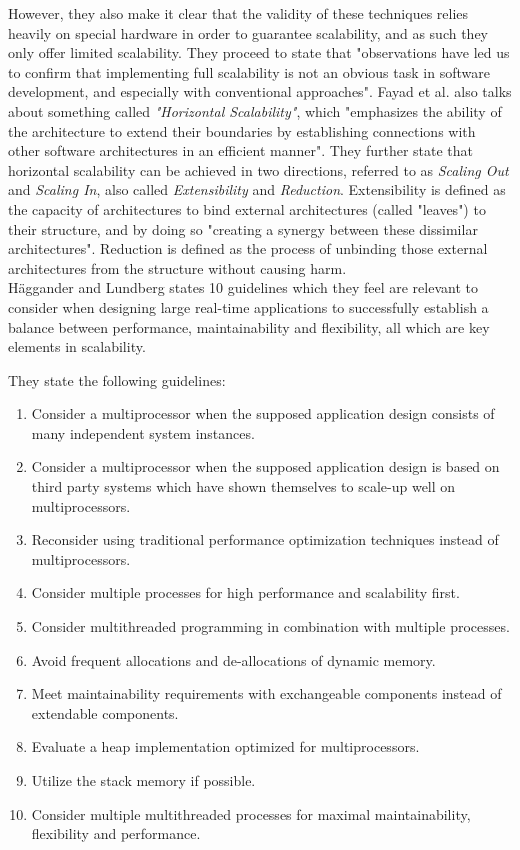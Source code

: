 \documentclass{article}
\begin{document}
However, they also make it clear that the validity of these techniques relies
heavily on special hardware in order to guarantee scalability, and as such they
only offer limited scalability. They proceed to state that "observations have led
us to confirm that implementing full scalability is not an obvious task in software
development, and especially with conventional approaches".
Fayad et al. also talks about something called \emph{"Horizontal Scalability"},
which "emphasizes the ability of the architecture to extend their boundaries by
establishing connections with other software architectures in an efficient
manner".  They further state that horizontal scalability can be achieved in two
directions, referred to as \emph{Scaling Out} and \emph{Scaling In}, also
called \emph{Extensibility} and \emph{Reduction}.  Extensibility is defined as
the capacity of architectures to bind external architectures (called "leaves")
to their structure, and by doing so "creating a synergy between these
dissimilar architectures".  Reduction is defined as the process of unbinding
those external architectures from the structure without causing harm.
\\

Häggander and Lundberg\cite{haggander1999guidelines} states 10 guidelines which
they feel are relevant to consider when designing large real-time applications
to successfully establish a balance between performance, maintainability and
flexibility, all which are key elements in scalability. 

They state the following guidelines:
\begin{enumerate}
\item{Consider a multiprocessor when the supposed application design consists
of many independent system instances.}
\item{Consider a multiprocessor when the supposed application design is based on
third party systems which have shown themselves to scale-up well on 
multiprocessors.}
\item{Reconsider using traditional performance optimization techniques instead
of multiprocessors.}
\item{Consider multiple processes for high performance and scalability first.}
\item{Consider multithreaded programming in combination with multiple processes.}
\item{Avoid frequent allocations and de-allocations of dynamic memory.}
\item{Meet maintainability requirements with exchangeable components instead
 of extendable components.}
\item{Evaluate a heap implementation optimized for multiprocessors.}
\item{Utilize the stack memory if possible.}
\item{Consider multiple multithreaded processes for maximal maintainability, 
flexibility and performance.}
\end{enumerate}
\end{document}
